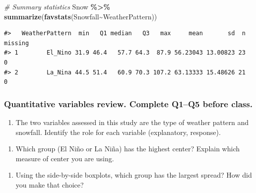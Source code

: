 \documentclass[
]{report}
\newenvironment{Shaded}{\begin{snugshade}}{\end{snugshade}}
\newcommand{\CommentTok}[1]{\textcolor[rgb]{0.56,0.35,0.01}{\textit{#1}}}
\newcommand{\KeywordTok}[1]{\textcolor[rgb]{0.13,0.29,0.53}{\textbf{#1}}}
\newcommand{\NormalTok}[1]{#1}
\newcommand{\OperatorTok}[1]{\textcolor[rgb]{0.81,0.36,0.00}{\textbf{#1}}}
\newcommand{\StringTok}[1]{\textcolor[rgb]{0.31,0.60,0.02}{#1}}
\providecommand{\tightlist}{%
  \setlength{\itemsep}{0pt}\setlength{\parskip}{0pt}}
\newcommand\latexcode[1]{#1}
\begin{document}
\begin{Shaded}
\begin{Highlighting}[]
\CommentTok{\# Summary statistics}
\NormalTok{Snow }\OperatorTok{\%\textgreater{}\%}\StringTok{ }
\StringTok{     }\KeywordTok{summarize}\NormalTok{(}\KeywordTok{favstats}\NormalTok{(Snowfall}\OperatorTok{\textasciitilde{}}\NormalTok{WeatherPattern))}
\end{Highlighting}
\end{Shaded}

\begin{verbatim}
#>   WeatherPattern  min   Q1 median   Q3   max     mean       sd  n missing
#> 1        El_Nino 31.9 46.4   57.7 64.3  87.9 56.23043 13.00823 23       0
#> 2        La_Nina 44.5 51.4   60.9 70.3 107.2 63.13333 15.48626 21       0
\end{verbatim}

\hypertarget{quantitative-variables-review.-complete-q1q5-before-class.}{%
\subsubsection*{Quantitative variables review. Complete Q1--Q5 before class.}\label{quantitative-variables-review.-complete-q1q5-before-class.}}

\begin{enumerate}
\def\labelenumi{\arabic{enumi}.}
\tightlist
\item
  The two variables assessed in this study are the type of weather pattern and snowfall. Identify the role for each variable (explanatory, response).
\end{enumerate}

\vspace{.6in}

\begin{enumerate}
\def\labelenumi{\arabic{enumi}.}
\setcounter{enumi}{1}
\tightlist
\item
  Which group (El Ni\latexcode{\~{n}}o or La Ni\latexcode{\~{n}}a) has the highest center? Explain which measure of center you are using.
\end{enumerate}

\vspace{.6in}

\begin{enumerate}
\def\labelenumi{\arabic{enumi}.}
\setcounter{enumi}{2}
\tightlist
\item
  Using the side-by-side boxplots, which group has the largest spread? How did you make that choice?
\end{enumerate}
\end{document}
